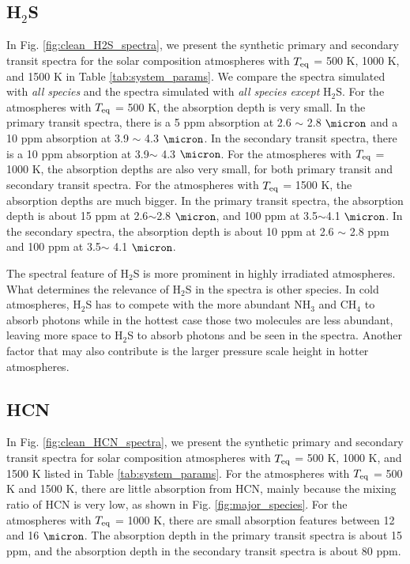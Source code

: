 \documentclass[twocolumn]{aastex61}
\begin{document}
\subsection{H$_2$S}\label{subsec:clean_H_2S}
In Fig. \ref{fig:clean_H2S_spectra}, we present the synthetic primary and secondary transit spectra for the solar composition atmospheres with $T_{\rm eq}$ = 500 K, 1000 K, and 1500 K in Table \ref{tab:system_params}. We compare the spectra simulated with \textit{all species}  and the spectra simulated with \textit{all species except} H$_2$S. For the atmospheres with $T_{\rm eq}$ = 500 K, the absorption depth is very small. In the primary transit spectra, there is a 5 ppm absorption at 2.6 $\sim$ 2.8 $\micron$ and a 10 ppm absorption at 3.9 $\sim$ 4.3 $\micron$. In the secondary transit spectra, there is a 10 ppm absorption at 3.9$\sim$ 4.3 $\micron$. For the atmospheres with $T_{\rm eq}$ = 1000 K, the absorption depths are also very small, for both primary transit and secondary transit spectra. For the atmospheres with $T_{\rm eq}$ = 1500 K, the absorption depths are much bigger. In the primary transit spectra, the absorption depth is about 15 ppm at 2.6$\sim$2.8 $\micron$, and 100 ppm at 3.5$\sim$4.1 $\micron$. In the secondary spectra, the absorption depth is about 10 ppm at 2.6 $\sim$ 2.8 ppm and 100 ppm at 3.5$\sim$ 4.1 $\micron$.   

The spectral feature of H$_2$S is more prominent in highly irradiated atmospheres. What determines the relevance of H$_2$S in the spectra is other species. In cold atmospheres, H$_2$S has to compete with the more abundant NH$_3$ and CH$_4$ to absorb photons while in the hottest case those two molecules are less abundant, leaving more space to H$_2$S to absorb photons and be seen in the spectra. Another factor that may also contribute is the larger pressure scale height in hotter atmospheres. 

\subsection{HCN}\label{subsec:clean_HCN}

In Fig. \ref{fig:clean_HCN_spectra}, we present the synthetic primary and secondary transit spectra for solar composition atmospheres with $T_{\rm eq}$ = 500 K, 1000 K, and 1500 K listed in Table \ref{tab:system_params}. For the atmospheres with $T_{\rm eq}$ = 500 K and 1500 K, there are little absorption from HCN, mainly because the mixing ratio of HCN is very low, as shown in Fig. \ref{fig:major_species}. For the atmospheres with $T_{\rm eq}$ = 1000 K, there are small absorption features between 12 and 16 $\micron$. The absorption depth in the primary transit spectra is about 15 ppm, and the absorption depth in the secondary transit spectra is about 80 ppm. 
\end{document}
